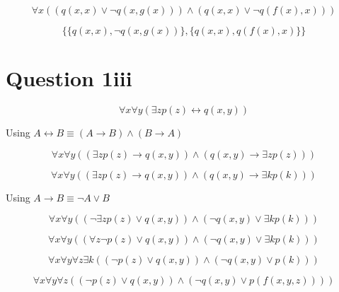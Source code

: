 \documentclass[10pt,a4paper]{article}
\begin{document}
\begin{equation}
 \forall x (( q(x,x) \vee \neg q(x,g(x)))\wedge (q(x,x) \vee \neg q(f(x),x)))
\end{equation}


\begin{equation}
 \{\{q(x,x),\neg q(x,g(x))\},\{q(x,x),q(f(x),x)\}\}
\end{equation}



\section{Question 1iii}


\begin{equation}
 \forall x \forall y(\exists z p(z) \leftrightarrow q(x,y))
\end{equation}

Using $A\leftrightarrow B \equiv (A\rightarrow B)\wedge (B\rightarrow A)$

\begin{equation}
 \forall x \forall y((\exists z p(z) \rightarrow q(x,y))\wedge(q(x,y)\rightarrow \exists z p(z)))
\end{equation}

\begin{equation}
 \forall x \forall y((\exists z p(z) \rightarrow q(x,y))\wedge(q(x,y)\rightarrow \exists k p(k)))
\end{equation}


Using $A\rightarrow B \equiv \neg A \vee B$


\begin{equation}
 \forall x \forall y((\neg\exists z p(z) \vee q(x,y))\wedge(\neg q(x,y) \vee \exists k p(k)))
\end{equation}

\begin{equation}
 \forall x \forall y(( \forall z \neg p(z) \vee q(x,y))\wedge(\neg q(x,y) \vee \exists k p(k)))
\end{equation}

\begin{equation}
 \forall x \forall y \forall z \exists k(( \neg p(z) \vee q(x,y))\wedge(\neg q(x,y) \vee p(k)))
\end{equation}

\begin{equation}
 \forall x \forall y \forall z (( \neg p(z) \vee q(x,y))\wedge(\neg q(x,y) \vee p(f(x,y,z))))
\end{equation}
\end{document}
